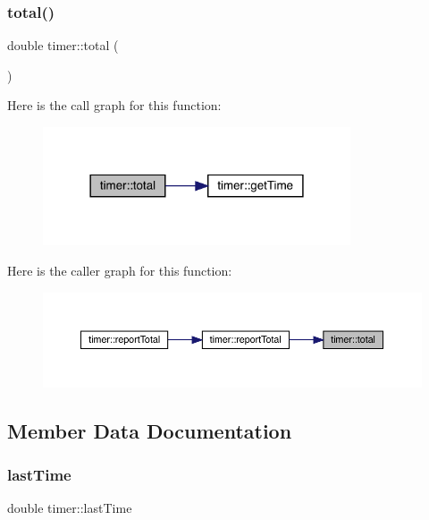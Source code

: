 \subsubsection{\texorpdfstring{total()}{total()}}
{\footnotesize\ttfamily double timer\+::total (\begin{DoxyParamCaption}{ }\end{DoxyParamCaption})\hspace{0.3cm}{\ttfamily [inline]}}

Here is the call graph for this function\+:\nopagebreak
\begin{figure}[H]
\begin{center}
\leavevmode
\includegraphics[width=258pt]{structtimer_a1d51e750078352abcabedc232e122dbc_cgraph}
\end{center}
\end{figure}
Here is the caller graph for this function\+:\nopagebreak
\begin{figure}[H]
\begin{center}
\leavevmode
\includegraphics[width=350pt]{structtimer_a1d51e750078352abcabedc232e122dbc_icgraph}
\end{center}
\end{figure}


\subsection{Member Data Documentation}
\mbox{\label{structtimer_a869b4cac18d1234c721c8314514914a4}} 
\subsubsection{\texorpdfstring{lastTime}{lastTime}}
{\footnotesize\ttfamily double timer\+::last\+Time}

